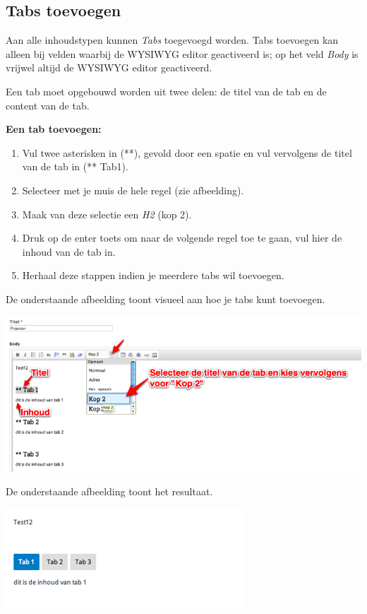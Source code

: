 \subsection{Tabs toevoegen}\label{tabstoevoegen}
Aan alle inhoudstypen kunnen \emph{Tabs} toegevoegd worden. 
Tabs toevoegen kan alleen bij velden waarbij de WYSIWYG  editor geactiveerd is; op het veld \emph{Body} is vrijwel altijd de WYSIWYG editor geactiveerd.

Een tab moet opgebouwd worden uit twee delen: de titel van de tab en de content van de tab.

\textbf{Een tab toevoegen:} 

\begin{enumerate}
\item Vul twee asterisken in (**), gevold door een spatie en vul vervolgens de titel van de tab in (** Tab1).
\item Selecteer met je muis de hele regel (zie afbeelding).
\item Maak van deze selectie een \emph{H2} (kop 2).
\item Druk op de enter toets om naar de volgende regel toe te gaan, vul hier de inhoud van de tab in.
\item Herhaal deze stappen indien je meerdere tabs wil toevoegen.
\end{enumerate}

De onderstaande afbeelding toont visueel aan hoe je tabs kunt toevoegen.

\begin{center}
	\includegraphics[width=\textwidth]{img/tabs1}
\end{center}

De onderstaande afbeelding toont het resultaat.

\begin{center}
	\includegraphics[width=\textwidth]{img/tabs2}
\end{center}